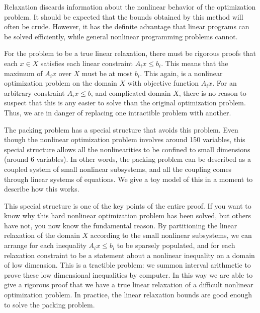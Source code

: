 Relaxation discards information about the nonlinear behavior of the
optimization problem.  It should be expected that the bounds
obtained by this method will often be crude.  However, it has the
definite advantage that linear programs can be solved efficiently,
while general nonlinear programming problems cannot.

For the problem to be a true linear relaxation, there must be rigorous
proofs that each $x\in X$ satisfies each linear constraint $A_i x\le
b_i$.  This means that the maximum of $A_i x$ over $X$ must be at most
$b_i$.  This again, is a nonlinear optimization problem on the domain
$X$ with objective function $A_i x$.  For an arbitrary constraint $A_i
x\le b$, and complicated domain $X$, there is no reason to suspect
that this is any easier to solve than the original optimization
problem.  Thus, we are in danger of replacing one intractible problem
with another.

The packing problem has a special structure that avoids this
problem.  Even though the nonlinear optimization problem involves
around 150 variables, 
this special structure allows all the nonlinearities to 
be confined to small dimensions (around 6 variables).  In other words,
the packing problem can be
described as a coupled system of small nonlinear subsystems,
and all the coupling comes through linear systems of equations. 
We give a toy model of this in a moment to describe how this works.

This special structure is one of the key points of the entire proof.
If you want to know why this hard nonlinear optimization problem has
been solved, but others have not, you now know the fundamental reason.
By partitioning the linear relaxation of the domain $X$ according
to the small nonlinear subsystems, we can arrange for each inequality
$A_i x\le b_i$ to be sparsely populated, and for each relaxation
constraint to be a statement about a nonlinear inequality on a domain
of low dimension.  This is a tractible problem:
we  summon interval arithmetic to prove these
low dimensional inequalities by computer.  In this way we are able
to give a rigorous proof that we have a true linear relaxation of a
difficult nonlinear optimization problem.  In practice, the linear
relaxation  bounds  are good enough to solve the packing
problem.





\clearpage
